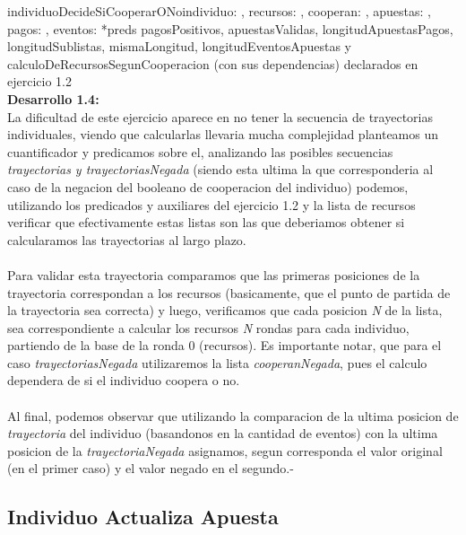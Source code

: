 \documentclass[10pt,a4paper]{article}
\begin{document}
\begin{proc}{individuoDecideSiCooperarONo}{\In individuo: \nat, \In recursos: \TLista{\float}, \Inout cooperan: \TLista{\bool}, \In apuestas: \TLista{\TLista{\float}}, \In pagos: \TLista{\float}, \In eventos: \TLista{\TLista{\nat}}}{}
    *preds pagosPositivos, apuestasValidas, longitudApuestasPagos, longitudSublistas, mismaLongitud, longitudEventosApuestas y calculoDeRecursosSegunCooperacion (con sus dependencias) declarados en ejercicio 1.2
\\
\textbf{Desarrollo 1.4:}
\\
 La dificultad de este ejercicio aparece en no tener la secuencia de trayectorias individuales, viendo que calcularlas llevaria mucha complejidad planteamos un cuantificador y predicamos sobre el, analizando las posibles secuencias \textit{trayectorias y trayectoriasNegada} (siendo esta ultima la que corresponderia al caso de la negacion del booleano de cooperacion del individuo) podemos, utilizando los predicados y auxiliares del ejercicio 1.2 y la lista de recursos verificar que efectivamente estas listas son las que deberiamos obtener si calcularamos las trayectorias al largo plazo. \\ \\
Para validar esta trayectoria comparamos que las primeras posiciones de la trayectoria correspondan a los recursos (basicamente, que el punto de partida de la trayectoria sea correcta) y luego, verificamos que cada posicion \textit{N} de la lista, sea correspondiente a calcular los recursos \textit{N} rondas para cada individuo, partiendo de la base de la ronda 0 (recursos). Es importante notar, que para el caso \textit{trayectoriasNegada} utilizaremos la lista \textit{cooperanNegada}, pues el calculo dependera de si el individuo coopera o no.
\\ \\
Al final, podemos observar que utilizando la comparacion de la ultima posicion de \textit{trayectoria} del individuo (basandonos en la cantidad de eventos) con la ultima posicion de la \textit{trayectoriaNegada} asignamos, segun corresponda el valor original (en el primer caso) y el valor negado en el segundo.-


\end{proc}

\subsection{Individuo Actualiza Apuesta}
\end{document}
